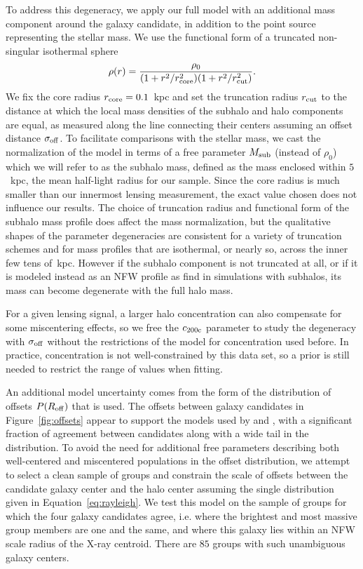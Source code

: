 \documentclass[12pt]{emulateapj}
\begin{document}
To address this degeneracy, we apply our full model with an additional mass
component around the galaxy candidate, in addition to the point source
representing the stellar mass. We use the functional form of a
truncated non-singular isothermal sphere \citep{PastorMira2011}
\begin{equation}
\rho(r)=\frac{\rho_0}{(1+r^2/r_{\rm core}^2)(1+r^2/r_{\rm cut}^2)}.
\label{eq:tnsi}
\end{equation}
We fix the core radius $r_{\rm core}=0.1$~{\rm kpc} and set the truncation
radius $r_{\rm cut}$ to the distance at which the local mass
densities of the subhalo and halo components are equal, as measured
along the line connecting their centers assuming an offset distance
$\sigma_{\rm off}$. To facilitate comparisons
with the stellar mass, we cast the normalization of the model in terms
of a free parameter $M_{\rm sub}$ (instead of $\rho_{0}$) which we
will refer to as the subhalo mass, defined as the mass enclosed within
$5$~{\rm kpc}, the mean half-light radius for our sample. Since the core
radius is much smaller than our innermost lensing measurement, the
exact value chosen does not influence our results. The choice of
truncation radius and functional form of the subhalo mass profile does
affect the mass normalization, but the qualitative shapes of the
parameter degeneracies are consistent for a variety of truncation
schemes and for mass profiles that are isothermal, or nearly so,
across the inner few tens of~{\rm kpc}. However if the subhalo
component is not truncated at all, or if it is modeled instead as an
NFW profile as \citeauthor{PastorMira2011} find in simulations with
subhalos, its mass can become degenerate with the full halo
mass.

For a given lensing signal, a larger halo concentration can also compensate
for some miscentering effects, so we free the $c_{\rm 200c}$ parameter
to study the degeneracy with $\sigma_{\rm off}$ without the
restrictions of the model for concentration used before. In practice,
concentration is not well-constrained by this data set, so a prior is still
needed to restrict the range of values when fitting.

An additional model uncertainty comes from the form of the
distribution of offsets $P(R_{\rm off})$ that is used. The offsets
between galaxy candidates in Figure~\ref{fig:offsets} appear to
support the models used by \citet{Johnston2007b} and \citet{Oguri2010},
with a significant fraction of agreement between candidates along with
a wide tail in the distribution. To avoid the need for additional free
parameters describing both well-centered and miscentered populations in the offset distribution,
we attempt to select a clean sample of groups and constrain the scale
of offsets between the candidate galaxy center and the halo center
assuming the single distribution given in
Equation~\eqref{eq:rayleigh}. We test this model on the sample of
groups for which the four galaxy candidates agree, i.e. where the
brightest and most massive group members are one and the same, and
where this galaxy lies within an NFW scale radius of the X-ray
centroid. There are $85$ groups with such unambiguous galaxy centers.
\end{document}
